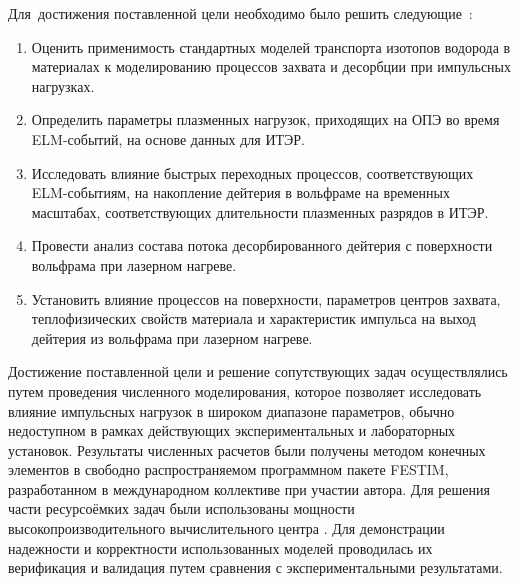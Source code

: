 Для~достижения поставленной цели необходимо было решить следующие~{\tasks}:
\begin{enumerate}[beginpenalty=10000] %
    \item Оценить применимость стандартных моделей транспорта изотопов водорода в материалах к моделированию процессов захвата и десорбции при импульсных нагрузках.
    \item Определить параметры плазменных нагрузок, приходящих на ОПЭ во время ELM-событий, на основе данных для ИТЭР.
    \item Исследовать влияние быстрых переходных процессов, соответствующих ELM-событиям, на накопление дейтерия в вольфраме на временных масштабах, соответствующих длительности плазменных разрядов в ИТЭР.
    \item Провести анализ состава потока десорбированного дейтерия с поверхности вольфрама при лазерном нагреве.
    \item Установить влияние процессов на поверхности, параметров центров захвата, теплофизических свойств материала и характеристик импульса на выход дейтерия из вольфрама при лазерном нагреве.
\end{enumerate}

{\methods} Достижение поставленной цели и решение сопутствующих задач осуществлялись путем проведения численного моделирования, которое позволяет исследовать влияние импульсных нагрузок в широком диапазоне параметров, обычно недоступном в рамках действующих экспериментальных и лабораторных установок. Результаты численных расчетов были получены методом конечных элементов в свободно распространяемом программном пакете FESTIM, разработанном в международном коллективе при участии автора. Для решения части ресурсоёмких задач были использованы мощности высокопроизводительного вычислительного центра \thesisOrganizationShort. Для демонстрации надежности и корректности использованных моделей проводилась их верификация и валидация путем сравнения с экспериментальными результатами.

